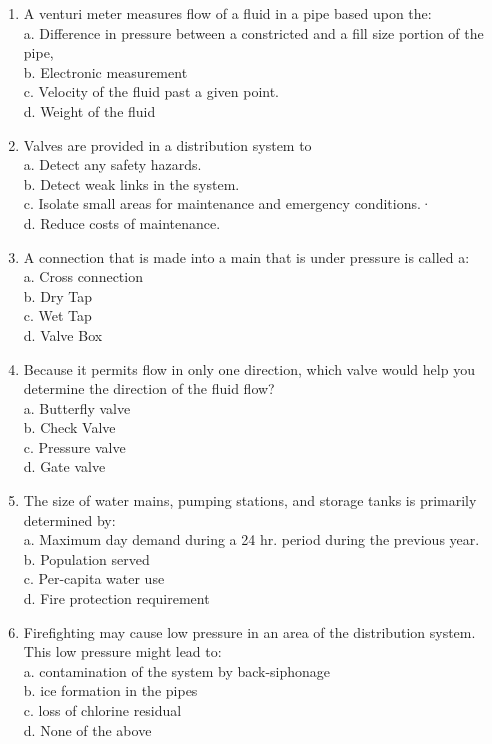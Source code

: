 \documentclass{article}
\begin{document}
\begin{enumerate}[1.]
\item A venturi meter measures flow of a fluid in a pipe based upon the:\\
a. Difference in pressure between a constricted and a fill size portion of the pipe,\\
b. Electronic measurement\\
c. Velocity of the fluid past a given point.\\
d. Weight of the fluid\\

\item Valves are provided in a distribution system to\\
a. Detect any safety hazards.\\
b. Detect weak links in the system.\\
c. Isolate small areas for maintenance and emergency conditions.·\\
d. Reduce costs of maintenance.\\

\item A connection that is made into a main that is under pressure is called a:\\
a. Cross connection\\
b. Dry Tap\\
c. Wet Tap\\
d. Valve Box\\

\item  Because it permits flow in only one direction, which valve would help you determine the direction of the fluid flow?\\
a. Butterfly valve\\
b. Check Valve\\
c. Pressure valve\\
d. Gate valve\\

\item The size of water mains, pumping stations, and storage tanks is primarily
determined by:\\
a. Maximum day demand during a 24 hr. period during the previous year.\\
b. Population served\\
c. Per-capita water use\\
d. Fire protection requirement\\

\item Firefighting may cause low pressure in an area of the distribution system. This low pressure might lead to:\\
a. contamination of the system by back-siphonage\\
b. ice formation in the pipes\\
c. loss of chlorine residual\\
d. None of the above\\
\end{enumerate}
\end{document}

